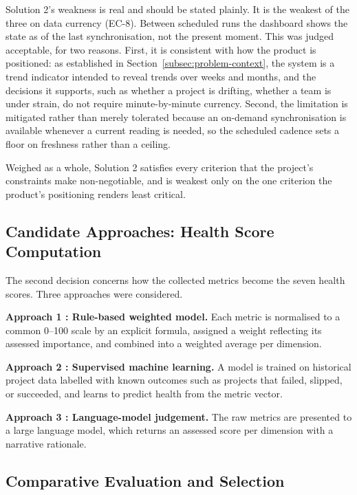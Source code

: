 Solution 2's weakness is real and should be stated plainly. It is the weakest of the
three on data currency (EC-8). Between scheduled runs the dashboard shows the
state as of the last synchronisation, not the present moment. This was judged
acceptable, for two reasons. First, it is consistent with how the product is
positioned: as established in Section~\ref{subsec:problem-context}, the system is
a trend indicator intended to reveal trends over weeks and months, and the
decisions it supports, such as whether a project is drifting, whether a team is under
strain, do not require minute-by-minute currency. Second, the limitation is
mitigated rather than merely tolerated because an on-demand synchronisation is available
whenever a current reading is needed, so the scheduled cadence sets a floor on
freshness rather than a ceiling.

Weighed as a whole, Solution 2 satisfies every criterion that the project's constraints
make non-negotiable, and is weakest only on the one criterion the product's
positioning renders least critical.

\subsection{Candidate Approaches: Health Score Computation}
\label{subsec:secondary-candidates}

The second decision concerns how the collected metrics become the seven health
scores. Three approaches were considered.

\textbf{Approach 1 : Rule-based weighted model.} Each metric is normalised to a common
0--100 scale by an explicit formula, assigned a weight reflecting its assessed
importance, and combined into a weighted average per dimension.

\textbf{Approach 2 : Supervised machine learning.} A model is trained on historical
project data labelled with known outcomes such as projects that failed, slipped, or
succeeded, and learns to predict health from the metric vector.

\textbf{Approach 3 : Language-model judgement.} The raw metrics are presented to a large
language model, which returns an assessed score per dimension with a narrative
rationale.

\subsection{Comparative Evaluation and Selection}
\label{subsec:secondary-selection}


